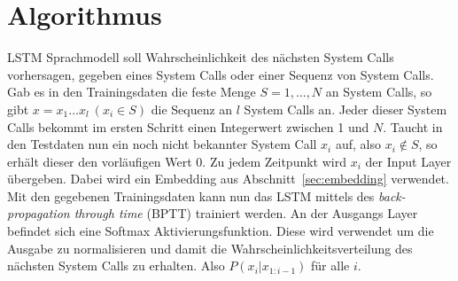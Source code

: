 
    \section{Algorithmus}\label{sec:Algorithmus}
        \ac{LSTM} Sprachmodell soll Wahrscheinlichkeit des nächsten System Calls vorhersagen, gegeben eines System Calls oder einer Sequenz von System Calls.
        Gab es in den Trainingsdaten die feste Menge $S = {1,\dots,N}$ an System Calls, so gibt $x=x_1\dots x_l \ (x_i\in S)$ die Sequenz an $l$ System Calls an.
        Jeder dieser System Calls bekommt im ersten Schritt einen Integerwert zwischen 1 und $N$.
        Taucht in den Testdaten nun ein noch nicht bekannter System Call $x_i$ auf, also $x_i \notin S$, so erhält dieser den vorläufigen Wert 0.
        Zu jedem Zeitpunkt wird $x_i$ der Input Layer übergeben.
        Dabei wird ein Embedding aus Abschnitt~\ref{sec:embedding} verwendet. 
        Mit den gegebenen Trainingsdaten kann nun das \ac{LSTM} mittels des \textit{back-propagation through time} (BPTT) trainiert werden.
        An der Ausgangs Layer befindet sich eine Softmax Aktivierungsfunktion.
        Diese wird verwendet um die Ausgabe zu normalisieren und damit die Wahrscheinlichkeitsverteilung des nächsten System Calls zu erhalten.
        Also $P\left(x_i|x_{1:i-1}\right)$ für alle $i$. 
        

